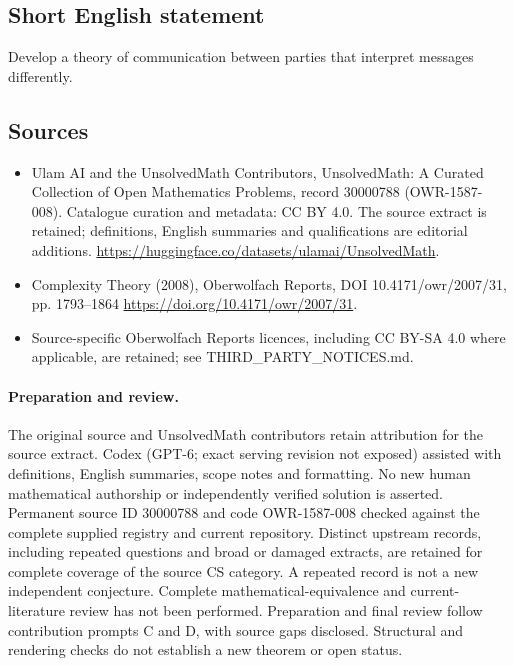 \documentclass[11pt]{article}
\begin{document}
\subsection{Short English statement}
Develop a theory of communication between parties that interpret messages differently.
\subsection{Sources}
\begin{itemize}
\item[\hypertarget{source:30000788:1}{S1}] Ulam AI and the UnsolvedMath Contributors, UnsolvedMath: A Curated Collection of Open Mathematics Problems, record 30000788 (OWR-1587-008). Catalogue curation and metadata: CC BY 4.0. The source extract is retained; definitions, English summaries and qualifications are editorial additions.
\url{https://huggingface.co/datasets/ulamai/UnsolvedMath}.
\item[\hypertarget{source:30000788:2}{S2}] Complexity Theory (2008), Oberwolfach Reports, DOI 10.4171/owr/2007/31, pp. 1793--1864
\url{https://doi.org/10.4171/owr/2007/31}.
\item Source-specific Oberwolfach Reports licences, including CC BY-SA 4.0 where applicable, are retained; see THIRD\_PARTY\_NOTICES.md.
\end{itemize}
\paragraph{Preparation and review.}
The original source and UnsolvedMath contributors retain attribution for the source extract. Codex (GPT-6; exact serving revision not exposed) assisted with definitions, English summaries, scope notes and formatting. No new human mathematical authorship or independently verified solution is asserted. Permanent source ID 30000788 and code OWR-1587-008 checked against the complete supplied registry and current repository. Distinct upstream records, including repeated questions and broad or damaged extracts, are retained for complete coverage of the source CS category. A repeated record is not a new independent conjecture. Complete mathematical-equivalence and current-literature review has not been performed. Preparation and final review follow contribution prompts C and D, with source gaps disclosed. Structural and rendering checks do not establish a new theorem or open status.
\label{end:30000788}
\end{document}
